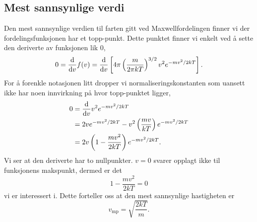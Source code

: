 \subsection{Mest sannsynlige verdi}
Den mest sannsynlige verdien til farten gitt ved Maxwellfordelingen finner vi der fordelingsfunksjonen har et topp-punkt. Dette punktet finner vi enkelt ved å sette den deriverte av funksjonen lik 0,
\begin{displaymath}
	0 = \frac{\text{d}}{\text{d} v}f(v) = \frac{\text{d}}{\text{d} v} \left[ 4\pi\left(\frac{m}{2\pi kT}\right)^{3/2} v^2 e^{-mv^2/2kT}\right].
\end{displaymath}
For å forenkle notasjonen litt dropper vi normaliseringskonstanten som uansett ikke har noen innvirkning på hvor topp-punktet ligger,
\begin{displaymath}
\begin{aligned}
	0 &= \frac{\text{d}}{\text{d} v}v^2e^{-mv^2/2kT} \\
	&= 2ve^{-mv^2/2kT} - v^2\left(\frac{mv}{kT}\right)e^{-mv^2/2kT} \\
	&= 2v\left(1-\frac{mv^2}{2kT}\right)e^{-mv^2/2kT}.
\end{aligned}
\end{displaymath}
Vi ser at den deriverte har to nullpunkter. $v=0$ svarer opplagt ikke til funksjonens makspunkt, dermed er det 
\begin{displaymath}
	1-\frac{mv^2}{2kT} = 0
\end{displaymath}
vi er interessert i. Dette forteller oss at den mest sannsynlige hastigheten er
\begin{displaymath}
	v_\text{mp} = \sqrt{\frac{2kT}{m}}.
\end{displaymath}


